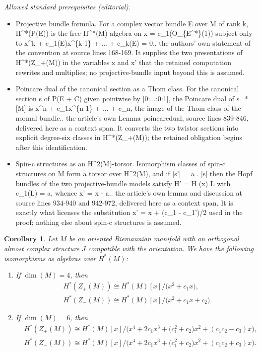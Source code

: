 \documentclass[10pt,a4paper]{amsart}
\numberwithin{equation}{section}
\newtheorem{Corollary}[Theorem]{Corollary}
\begin{document}
\noindent\textit{Allowed standard prerequisites (editorial).}\begin{itemize}
\item Projective bundle formula. For a complex vector bundle E over M of rank k, H\textasciicircum{}*(P(E)) is the free H\textasciicircum{}*(M)-algebra on x = c\_1(O\_\{E\textasciicircum{}*\}(1)) subject only to x\textasciicircum{}k + c\_1(E)x\textasciicircum{}\{k-1\} + ... + c\_k(E) = 0.. the authors' own statement of the convention at source lines 168-169. It supplies the two presentations of H\textasciicircum{}*(Z\_+(M)) in the variables x and x' that the retained computation rewrites and multiplies; no projective-bundle input beyond this is assumed.
\item Poincare dual of the canonical section as a Thom class. For the canonical section s of P(E + C) given pointwise by [0:...:0:1], the Poincare dual of s\_*[M] is x\textasciicircum{}n + c\_1x\textasciicircum{}\{n-1\} + ... + c\_n, the image of the Thom class of the normal bundle.. the article's own Lemma poincaredual, source lines 839-846, delivered here as a context span. It converts the two twistor sections into explicit degree-six classes in H\textasciicircum{}*(Z\_+(M)); the retained obligation begins after this identification.
\item Spin-c structures as an H\textasciicircum{}2(M)-torsor. Isomorphism classes of spin-c structures on M form a torsor over H\textasciicircum{}2(M), and if [s'] = a . [s] then the Hopf bundles of the two projective-bundle models satisfy H' = H (x) L with c\_1(L) = a, whence x' = x - a.. the article's own lemma and discussion at source lines 934-940 and 942-972, delivered here as a context span. It is exactly what licenses the substitution x' = x + (c\_1 - c\_1')/2 used in the proof; nothing else about spin-c structures is assumed.
\end{itemize}\medskip
\begin{Corollary}
\label{cohomtwis}
Let $M$ be an oriented Riemannian manifold with an orthogonal almost complex structure $J$ compatible with the orientation. We have the following isomorphisms as algebras over $H^*(M)$:
\begin{enumerate}\itemsep=0pt
\item[$1.$] If $\dim(M)=4$, then
\begin{align*}
&H^*(Z_+(M))\cong H^*(M)[x]/\big(x^2+c_1 x\big), \\
&H^*(Z_{-}(M))\cong H^*(M)[x]/\big(x^2 + c_1 x + c_2\big).
\end{align*}
\item[$2.$] If $\dim(M)=6$, then
\begin{align*}
&H^*(Z_+(M))\cong H^*(M)[x]/\big(x^4 +2c_1x^3 +\big(c_1^2+c_2\big) x^2 + (c_1c_2-c_3)x\big), \\
&H^*(Z_{-}(M))\cong H^*(M)[x]/\big(x^4 + 2c_1x^3+ \big(c_1^2+c_2\big)x^2 + (c_1c_2+c_3)x\big). \end{align*}
\end{enumerate}
\end{Corollary}
\end{document}
